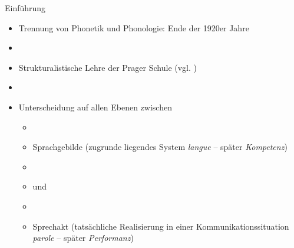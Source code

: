 \begin{frame}{Einführung}

\begin{itemize}
	\item Trennung von Phonetik und Phonologie: Ende der 1920er Jahre
	\item[]
	\item Strukturalistische Lehre der Prager Schule (vgl. \cite{Trubetzkoy89a})
	\item[]
	\item Unterscheidung auf allen Ebenen zwischen
	
	\begin{itemize}
		\item[]
		\item Sprachgebilde (zugrunde liegendes System \ras \textit{langue} -- später \textit{Kompetenz})
		\item[]
		\item[] und
		\item[]
		\item Sprechakt (tatsächliche Realisierung in einer Kommunikationssituation \textit{parole} -- später \textit{Performanz})
	\end{itemize}
	
\end{itemize}

\end{frame}





